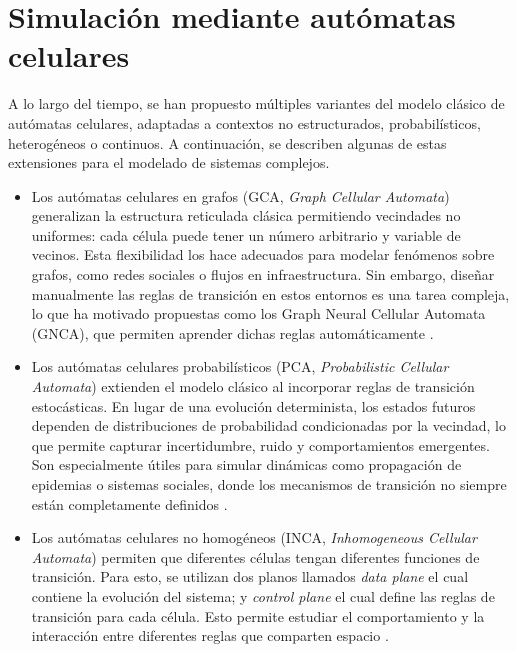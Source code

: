 \section{Simulación mediante autómatas celulares}

A lo largo del tiempo, se han propuesto múltiples variantes del modelo clásico de autómatas celulares, adaptadas a contextos no estructurados, probabilísticos, heterogéneos o continuos. A continuación, se describen algunas de estas extensiones para el modelado de sistemas complejos.

\begin{itemize}
	\item Los autómatas celulares en grafos (GCA, \textit{Graph Cellular Automata}) generalizan la estructura reticulada clásica permitiendo vecindades no uniformes: cada célula puede tener un número arbitrario y variable de vecinos. Esta flexibilidad los hace adecuados para modelar fenómenos sobre grafos, como redes sociales o flujos en infraestructura. Sin embargo, diseñar manualmente las reglas de transición en estos entornos es una tarea compleja, lo que ha motivado propuestas como los Graph Neural Cellular Automata (GNCA), que permiten aprender dichas reglas automáticamente \cite{neuripsGCA}.
	
	\item Los autómatas celulares probabilísticos (PCA, \textit{Probabilistic Cellular Automata}) extienden el modelo clásico al incorporar reglas de transición estocásticas. En lugar de una evolución determinista, los estados futuros dependen de distribuciones de probabilidad condicionadas por la vecindad, lo que permite capturar incertidumbre, ruido y comportamientos emergentes. Son especialmente útiles para simular dinámicas como propagación de epidemias o sistemas sociales, donde los mecanismos de transición no siempre están completamente definidos \cite{gacsPCA}.

	\item Los autómatas celulares no homogéneos (INCA, \textit{Inhomogeneous Cellular Automata}) permiten que diferentes células tengan diferentes funciones de transición. Para esto, se utilizan dos planos llamados \textit{data plane} el cual contiene la evolución del sistema; y \textit{control plane} el cual define las reglas de transición para cada célula. Esto permite estudiar el comportamiento y la interacción entre diferentes reglas que comparten espacio \cite{hartmanIHCA}.
	

\end{itemize}
